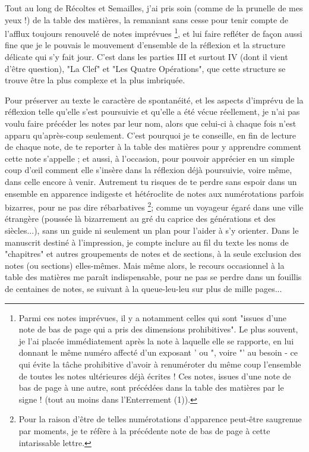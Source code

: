 Tout au long de Récoltes et Semailles, j'ai pris soin (comme de la prunelle de mes yeux !) de la table des matières, la remaniant sans cesse pour tenir compte de l'afflux toujours renouvelé de notes imprévues \footnote{Parmi ces notes imprévues, il y a notamment celles qui sont "issues d'une note de bas de page qui a pris des dimensions prohibitives". Le plus souvent, je l'ai placée immédiatement après la note à laquelle elle se rapporte, en lui donnant le même numéro affecté d'un exposant ' ou ", voire "' au besoin - ce qui évite la tâche prohibitive d'avoir à renuméroter du même coup l'ensemble de toutes les notes ultérieures déjà écrites ! Ces notes, issues d'une note de bas de page à une autre, sont précédées dans la table des matières par le signe ! (tout au moins dans l'Enterrement (1)).}, et lui faire refléter de façon aussi fine que je le pouvais le mouvement d'ensemble de la réflexion et la structure délicate qui s'y fait jour. C'est dans les parties III et surtout IV (dont il vient d'être question), "La Clef" et "Les Quatre Opérations", que cette structure se trouve être la plus complexe et la plus imbriquée.

Pour préserver au texte le caractère de spontanéité, et les aspects d'imprévu de la réflexion telle qu'elle s'est poursuivie et qu'elle a été vécue réellement, je n'ai pas voulu faire précéder les notes par leur nom, alors que celui-ci à chaque fois n'est apparu qu'après-coup seulement. C'est pourquoi je te conseille, en fin de lecture de chaque note, de te reporter à la table des matières pour y apprendre comment cette note s'appelle ; et aussi, à l'occasion, pour pouvoir apprécier en un simple coup d'œil comment elle s'insère dans la réflexion déjà poursuivie, voire même, dans celle encore à venir. Autrement tu risques de te perdre sans espoir dans un ensemble en apparence indigeste et hétéroclite de notes aux numérotations parfois bizarres, pour ne pas dire rébarbatives \footnote{Pour la raison d'être de telles numérotations d'apparence peut-être saugrenue par moments, je te réfère à la précédente note de bas de page à cette intarissable lettre.}; comme un voyageur égaré dans une ville étrangère (poussée là bizarrement au gré du caprice des générations et des siècles...), sans un guide ni seulement un plan pour l'aider à s'y orienter. Dans le manuscrit destiné à l'impression, je compte inclure au fil du texte les noms de "chapitres" et autres groupements de notes et de sections, à la seule exclusion des notes (ou sections) elles-mêmes. Mais même alors, le recours occasionnel à la table des matières me paraît indispensable, pour ne pas se perdre dans un fouillis de centaines de notes, se suivant à la queue-leu-leu sur plus de mille pages...

